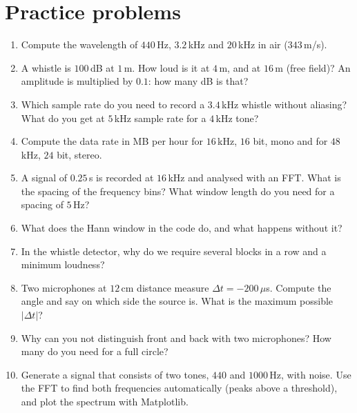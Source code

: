 \section*{Practice problems}
\begin{enumerate}[label=\textbf{\thechapter.\arabic*}]
  \item Compute the wavelength of $440$\,Hz, $3.2$\,kHz and $20$\,kHz in air ($343$\,m/s).
  \item A whistle is $100$\,dB at $1$\,m. How loud is it at $4$\,m, and at $16$\,m (free field)? An amplitude is multiplied by $0.1$: how many dB is that?
  \item Which sample rate do you need to record a $3.4$\,kHz whistle without aliasing? What do you get at $5$\,kHz sample rate for a $4$\,kHz tone?
  \item Compute the data rate in MB per hour for $16$\,kHz, $16$ bit, mono and for $48$\,kHz, $24$ bit, stereo.
  \item A signal of $0.25$\,s is recorded at $16$\,kHz and analysed with an FFT. What is the spacing of the frequency bins? What window length do you need for a spacing of $5$\,Hz?
  \item What does the Hann window in the code do, and what happens without it?
  \item In the whistle detector, why do we require several blocks in a row and a minimum loudness?
  \item Two microphones at $12$\,cm distance measure $\Delta t=-200\,\mu$s. Compute the angle and say on which side the source is. What is the maximum possible $|\Delta t|$?
  \item Why can you not distinguish front and back with two microphones? How many do you need for a full circle?
  \item[\textbf{\thechapter.10}$\star$] Generate a signal that consists of two tones, $440$ and $1000$\,Hz, with noise. Use the FFT to find both frequencies automatically (peaks above a threshold), and plot the spectrum with Matplotlib.
\end{enumerate}
